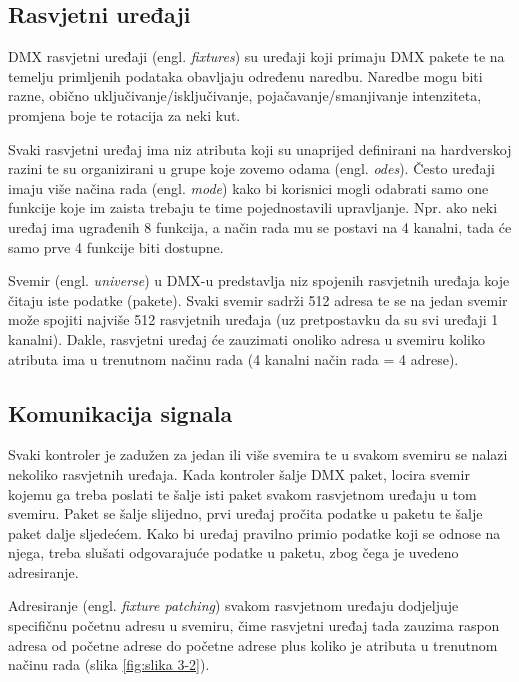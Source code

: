 \documentclass[times, utf8, zavrsni, numeric]{fer}
\begin{document}
\subsection{Rasvjetni uređaji}
DMX rasvjetni uređaji (engl. \emph{fixtures}) su uređaji koji primaju DMX pakete te na temelju primljenih podataka obavljaju određenu naredbu. Naredbe mogu biti razne, obično uključivanje/isključivanje, pojačavanje/smanjivanje intenziteta, promjena boje te rotacija za neki kut. \newline

Svaki rasvjetni uređaj ima niz atributa koji su unaprijed definirani na hardverskoj razini te su organizirani u grupe koje zovemo odama (engl. \emph{odes}). Često uređaji imaju više načina rada (engl. \emph{mode}) kako bi korisnici mogli odabrati samo one funkcije koje im zaista trebaju te time pojednostavili upravljanje. Npr. ako neki uređaj ima ugrađenih 8 funkcija, a način rada mu se postavi na 4 kanalni, tada će samo prve 4 funkcije biti dostupne. \newline

Svemir (engl. \emph{universe}) u DMX-u predstavlja niz spojenih rasvjetnih uređaja koje čitaju iste podatke (pakete). Svaki svemir sadrži 512 adresa te se na jedan svemir može spojiti najviše 512 rasvjetnih uređaja (uz pretpostavku da su svi uređaji 1 kanalni). Dakle, rasvjetni uređaj će zauzimati onoliko adresa u svemiru koliko atributa ima u trenutnom načinu rada (4 kanalni način rada = 4 adrese).

\subsection{Komunikacija signala}
Svaki kontroler je zadužen za jedan ili više svemira te u svakom svemiru se nalazi nekoliko rasvjetnih uređaja. Kada kontroler šalje DMX paket, locira svemir kojemu ga treba poslati te šalje isti paket svakom rasvjetnom uređaju u tom svemiru. Paket se šalje slijedno, prvi uređaj pročita podatke u paketu te šalje paket dalje sljedećem. Kako bi uređaj pravilno primio podatke koji se odnose na njega, treba slušati odgovarajuće podatke u paketu, zbog čega je uvedeno adresiranje. \newline

Adresiranje (engl. \emph{fixture patching}) svakom rasvjetnom uređaju dodjeljuje specifičnu početnu adresu u svemiru, čime rasvjetni uređaj tada zauzima raspon adresa od početne adrese do početne adrese plus koliko je atributa u trenutnom načinu rada (slika \ref{fig:slika 3-2}).
\end{document}
